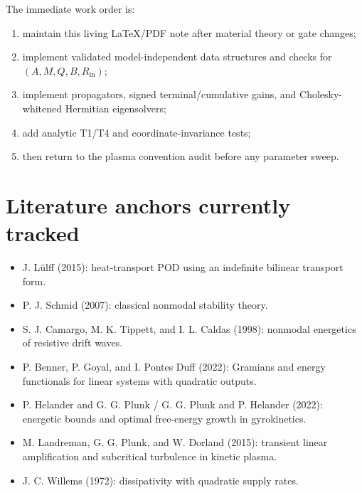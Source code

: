 \documentclass[11pt,a4paper]{article}
\begin{document}
The immediate work order is:
\begin{enumerate}[leftmargin=2em]
  \item maintain this living \LaTeX/PDF note after material theory or gate changes;
  \item implement validated model-independent data structures and checks for $(A,M,Q,B,R_{\mathrm{in}})$;
  \item implement propagators, signed terminal/cumulative gains, and Cholesky-whitened Hermitian eigensolvers;
  \item add analytic T1/T4 and coordinate-invariance tests;
  \item then return to the plasma convention audit before any parameter sweep.
\end{enumerate}

\section*{Literature anchors currently tracked}

\begin{itemize}[leftmargin=2em]
  \item J. L\"ulff (2015): heat-transport POD using an indefinite bilinear transport form.
  \item P. J. Schmid (2007): classical nonmodal stability theory.
  \item S. J. Camargo, M. K. Tippett, and I. L. Caldas (1998): nonmodal energetics of resistive drift waves.
  \item P. Benner, P. Goyal, and I. Pontes Duff (2022): Gramians and energy functionals for linear systems with quadratic outputs.
  \item P. Helander and G. G. Plunk / G. G. Plunk and P. Helander (2022): energetic bounds and optimal free-energy growth in gyrokinetics.
  \item M. Landreman, G. G. Plunk, and W. Dorland (2015): transient linear amplification and subcritical turbulence in kinetic plasma.
  \item J. C. Willems (1972): dissipativity with quadratic supply rates.
\end{itemize}
\end{document}
